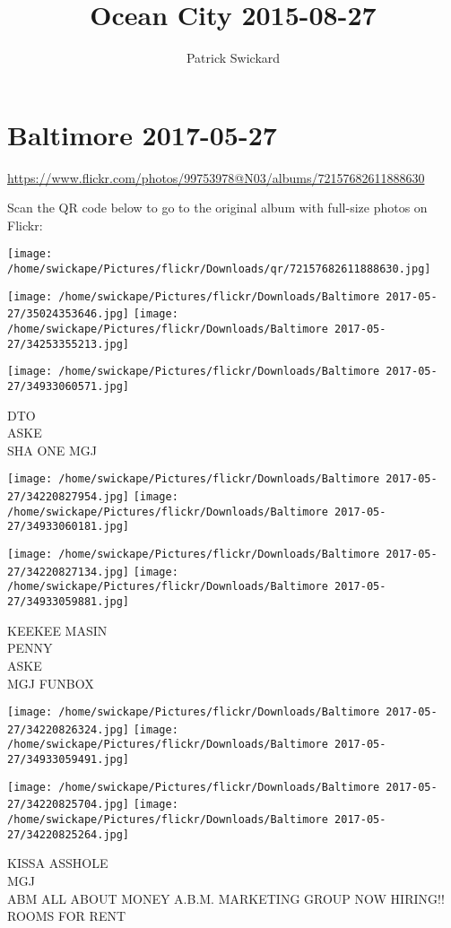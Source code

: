 \documentclass[10pt,letterpaper]{article}
\title{Ocean City 2015-08-27}
\author{Patrick Swickard}
\date{}
\begin{document}
\section*{Baltimore 2017-05-27}

\url{https://www.flickr.com/photos/99753978@N03/albums/72157682611888630}

Scan the QR code below to go to the original album with full-size photos on Flickr:

\texttt{[image: /home/swickape/Pictures/flickr/Downloads/qr/72157682611888630.jpg]}
\pagebreak

\texttt{[image: /home/swickape/Pictures/flickr/Downloads/Baltimore 2017-05-27/35024353646.jpg]}
\texttt{[image: /home/swickape/Pictures/flickr/Downloads/Baltimore 2017-05-27/34253355213.jpg]}

\vspace{0.25in}
\texttt{[image: /home/swickape/Pictures/flickr/Downloads/Baltimore 2017-05-27/34933060571.jpg]}

DTO\\
ASKE\\
SHA ONE MGJ
\pagebreak

\texttt{[image: /home/swickape/Pictures/flickr/Downloads/Baltimore 2017-05-27/34220827954.jpg]}
\texttt{[image: /home/swickape/Pictures/flickr/Downloads/Baltimore 2017-05-27/34933060181.jpg]}

\texttt{[image: /home/swickape/Pictures/flickr/Downloads/Baltimore 2017-05-27/34220827134.jpg]}
\texttt{[image: /home/swickape/Pictures/flickr/Downloads/Baltimore 2017-05-27/34933059881.jpg]}

KEEKEE MASIN\\
PENNY\\
ASKE\\
MGJ FUNBOX
\pagebreak

\texttt{[image: /home/swickape/Pictures/flickr/Downloads/Baltimore 2017-05-27/34220826324.jpg]}
\texttt{[image: /home/swickape/Pictures/flickr/Downloads/Baltimore 2017-05-27/34933059491.jpg]}

\texttt{[image: /home/swickape/Pictures/flickr/Downloads/Baltimore 2017-05-27/34220825704.jpg]}
\texttt{[image: /home/swickape/Pictures/flickr/Downloads/Baltimore 2017-05-27/34220825264.jpg]}

KISSA ASSHOLE\\
MGJ\\
ABM ALL ABOUT MONEY A.B.M. MARKETING GROUP NOW HIRING!!\\
ROOMS FOR RENT
\pagebreak
\end{document}

